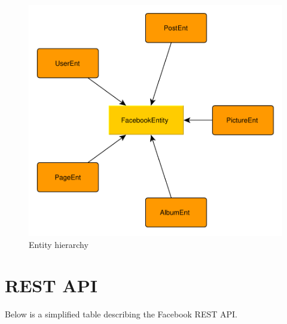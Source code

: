 \documentclass{article}
\begin{document}
\begin{figure}[H]
  \centering
  \includegraphics[scale=0.5]{diagrams/entity-hierarchy.pdf}
  \caption{Entity hierarchy}
  \label{ents}
\end{figure}

\section*{REST API}
Below is a simplified table describing the Facebook REST API.
\end{document}
